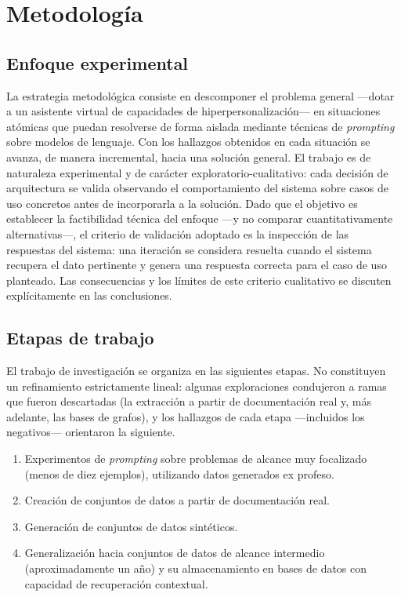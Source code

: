 \section{Metodología}

\subsection{Enfoque experimental}

La estrategia metodológica consiste en descomponer el problema general —dotar a un asistente virtual de capacidades de hiperpersonalización— en situaciones atómicas que puedan resolverse de forma aislada mediante técnicas de \textit{prompting} sobre modelos de lenguaje. Con los hallazgos obtenidos en cada situación se avanza, de manera incremental, hacia una solución general. El trabajo es de naturaleza experimental y de carácter exploratorio-cualitativo: cada decisión de arquitectura se valida observando el comportamiento del sistema sobre casos de uso concretos antes de incorporarla a la solución. Dado que el objetivo es establecer la factibilidad técnica del enfoque —y no comparar cuantitativamente alternativas—, el criterio de validación adoptado es la inspección de las respuestas del sistema: una iteración se considera resuelta cuando el sistema recupera el dato pertinente y genera una respuesta correcta para el caso de uso planteado. Las consecuencias y los límites de este criterio cualitativo se discuten explícitamente en las conclusiones.

\subsection{Etapas de trabajo}

El trabajo de investigación se organiza en las siguientes etapas. No constituyen un refinamiento estrictamente lineal: algunas exploraciones condujeron a ramas que fueron descartadas (la extracción a partir de documentación real y, más adelante, las bases de grafos), y los hallazgos de cada etapa —incluidos los negativos— orientaron la siguiente.

\begin{enumerate}
	\item Experimentos de \textit{prompting} sobre problemas de alcance muy focalizado (menos de diez ejemplos), utilizando datos generados ex profeso.
	\item Creación de conjuntos de datos a partir de documentación real.
	\item Generación de conjuntos de datos sintéticos.
	\item Generalización hacia conjuntos de datos de alcance intermedio (aproximadamente un año) y su almacenamiento en bases de datos con capacidad de recuperación contextual.
\end{enumerate}

